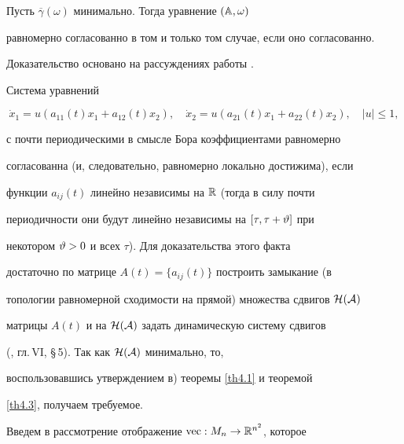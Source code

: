 \begin{thm}


\label{th4.3}


Пусть $\overline\gamma(\omega)$ минимально. Тогда уравнение $(\Bbb A,\omega)$


равномерно согласованно в том и только том случае, если оно согласованно.


\end{thm}





Доказательство основано на рассуждениях работы \cite{PT94}.





\begin{exam}


\label{ex1}


Система уравнений


$$


\Dot x_1=u(a_{11}(t)x_1+a_{12}(t)x_2),\quad


\Dot x_2=u(a_{21}(t)x_1+a_{22}(t)x_2),\quad |u|\le 1,


$$


с почти периодическими в смысле Бора коэффициентами равномерно


согласованна (и, следовательно, равномерно локально достижима), если


функции $a_{ij}(t)$ линейно независимы на $\Bbb R$ (тогда в силу почти


периодичности они будут линейно независимы на $[\tau,\tau+\vartheta]$ при


некотором $\vartheta>0$ и всех $\tau$). Для доказательства этого факта


достаточно по матрице $A(t)=\{a_{ij}(t)\}$ построить замыкание (в


топологии равномерной сходимости на прямой) множества сдвигов $\cal H(A)$


матрицы $A(t)$ и на $\cal H(A)$ задать динамическую систему сдвигов


(\cite{NS}, гл.\,VI, \S\,5). Так как $\cal H(A)$ минимально, то,


воспользовавшись утверждением в) теоремы \ref{th4.1} и теоремой


\ref{th4.3}, получаем требуемое.


\end{exam}





Введем в рассмотрение отображение $\operatorname{vec}:M_n\to\Bbb R^{n^2}$, которое


